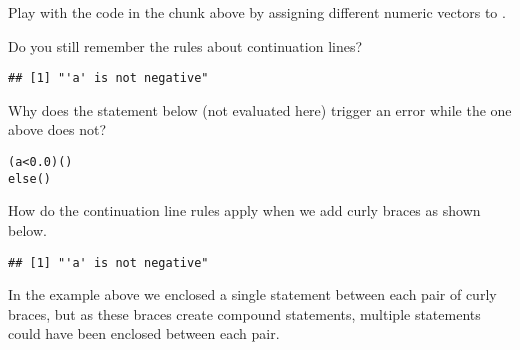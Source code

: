 \documentclass[krantz2]{krantz}\usepackage{knitr}%
\begin{document}
\begin{playground}
Play with the code in the chunk above by assigning different numeric vectors to .
\end{playground}



\begin{explainbox}
Do you still remember the rules about continuation lines?

\begin{knitrout}\footnotesize
{}\color{fgcolor}\begin{kframe}
\begin{alltt}
 \hlkwb{<-} 
  \hlopt{<} \hlstd{)} \hlstd{(}\hlstd{)}  \hlstd{(}\hlstd{)}
\end{alltt}
\begin{verbatim}
## [1] "'a' is not negative"
\end{verbatim}
\end{kframe}
\end{knitrout}

Why does the statement below (not evaluated here) trigger an error while the one above does not?

\begin{knitrout}\footnotesize
{}\color{fgcolor}\begin{kframe}
\begin{alltt}
 (a < 0.0) ()
else ()
\end{alltt}
\end{kframe}
\end{knitrout}

How do the continuation line rules apply when we add curly braces as shown below.

\begin{knitrout}\footnotesize
{}\color{fgcolor}\begin{kframe}
\begin{alltt}
 \hlkwb{<-} 
  \hlopt{<} \hlstd{) \{}
    \hlstd{(}\hlstd{)}
  \hlstd{\}}  \hlstd{\{}
    \hlstd{(}\hlstd{)}
  \hlstd{\}}
\end{alltt}
\begin{verbatim}
## [1] "'a' is not negative"
\end{verbatim}
\end{kframe}
\end{knitrout}

In the example above we enclosed a single statement between each pair of curly braces, but as these braces create compound statements, multiple statements could have been enclosed between each pair.
\end{explainbox}
\end{document}
